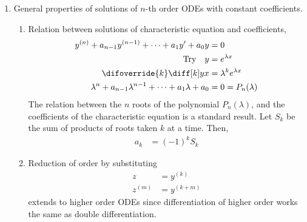 \begin{enumerate}
      \item General properties of solutions of $ n $-th order ODEs with constant
            coefficients.
            \begin{enumerate}
                  \item Relation between solutions of characteristic equation and
                        coefficients,
                        \begin{align}
                              y^{(n)} + a_{n-1}y^{(n-1)} + \dots + a_{1}y' + a_{0}y
                                                           & = 0                  \\
                              \text{Try} \quad y           & = e^{\lambda x}      \\
                              \difoverride{k} \diff[k] yx  & = \lambda^{k}
                              e^{\lambda x}                                       \\
                              \lambda^{n} + a_{n-1}\lambda^{n-1} +
                              \dots + a_{1}\lambda + a_{0} & = 0 = P_{n}(\lambda)
                        \end{align}
                        The relation between the $ n $ roots of the polynomial
                        $ P_{n}(\lambda) $, and the coefficients of the characteristic
                        equation is a standard result. Let $ S_{k} $ be the sum of
                        products of roots taken $ k $ at a time. Then,
                        \begin{align}
                              a_{k} & = (-1)^{k} S_{k}
                        \end{align}

                  \item Reduction of order by substituting
                        \begin{align}
                              z       & = y^{(k)}   \\
                              z^{(m)} & = y^{(k+m)}
                        \end{align}
                        extends to higher order ODEs since differentiation of higher
                        order works the same as double differentiation.


\end{enumerate}
\end{enumerate}
